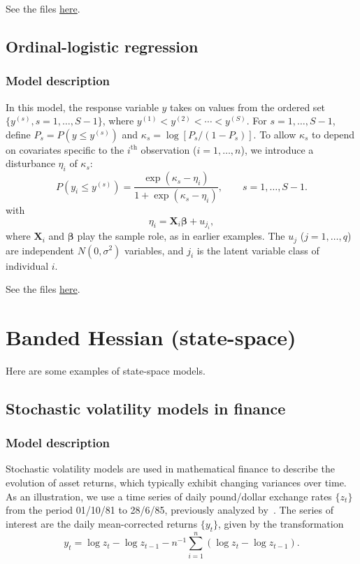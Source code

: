 \documentclass{admbmanual}
\newcommand{\citeasnoun}{\cite}
\begin{document}
See the files
\href{http://otter-rsch.com/admbre/examples/weights/weights.html}{here}.

\subsection{Ordinal-logistic regression}
\label{sec:socatt_example}

\subsubsection{Model description}

In this model, the response variable $y$ takes on values from the ordered set
$\{y^{(s)},s=1,\ldots,S-1\}$, where $y^{(1)}<y^{(2)}<\cdots<y^{(S)}$. For
$s=1,\ldots,S-1$, define $P_s=P(y\leq y^{(s)})$ and $\kappa_s=\log
[P_s/(1-P_s)]$. To allow $\kappa_s$ to depend on covariates specific to the
$i^{\textrm{th}}$ observation ($i=1,\ldots,n$), we introduce a
disturbance $\eta_i$ of $\kappa_s$:
\[
P(y_i\leq y^{(s)}) =
\frac{\exp(\kappa_s-\eta_i)}
{1+\exp(\kappa_s-\eta_i)}, \qquad s=1,\ldots,S-1.
\]
with
\[
\eta_i = \mathbf{X}_i\mathbf{\beta}+u_{j_i},
\]
where $\mathbf{X}_i$ and $\mathbf{\beta}$ play the sample role, as in earlier
examples. %
The $u_j$ ($j=1,\ldots,q$) are independent $N(0,\sigma^2)$ variables, and $j_i$
is the latent variable class of individual $i$.

See the files
\href{http://otter-rsch.com/admbre/examples/socatt/socatt.html}{here}.

\section{Banded Hessian (state-space)}

Here are some examples of state-space models.

\subsection{Stochastic volatility models in finance}

\subsubsection{Model description}

Stochastic volatility models are used in mathematical finance to describe the
evolution of asset returns, which typically exhibit changing variances over
time. As an illustration, we use a time series of daily pound/dollar exchange
rates $\{z_t\}$ from the period 01/10/81 to 28/6/85, previously analyzed
by~\citeasnoun{harv:ruiz:shep:1994}. The series of interest are the daily
mean-corrected returns $\{y_t\}$, given by the transformation
\[
y_t = \log z_t - \log z_{t-1} - n^{-1}\sum_{i=1}^n(\log z_t-\log z_{t-1}).
\]
\end{document}
